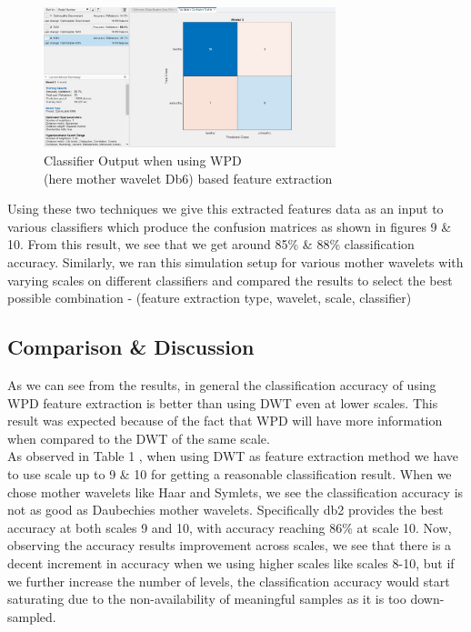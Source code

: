 \documentclass[10pt,twocolumn,letterpaper]{article}
\begin{document}
\begin{figure}[htbp]
\includegraphics[width=8.5cm]{WPD_result_db6.jpg}
\caption{Classifier Output when using WPD \\ (here mother wavelet Db6) based feature extraction}
\label{WPD Simulation}
\end{figure}
Using these two techniques we give this extracted features data as an input to various classifiers which produce the confusion matrices as shown in figures 9 \& 10. From this result, we see that we get around 85\% \& 88\% classification accuracy. Similarly, we ran this simulation setup for various mother wavelets with varying scales on different classifiers and compared the results to select the best possible combination - (feature extraction type, wavelet, scale, classifier)
\subsection{Comparison \& Discussion}

As we can see from the results, in general the classification accuracy of using WPD feature extraction is better than using DWT even at lower scales. This result was expected because of the fact that WPD will have more information when compared to the DWT of the same scale. \\
As observed in Table 1 , when using DWT as feature extraction method we have to use scale up to 9 \& 10 for getting a reasonable classification result. When we chose mother wavelets like Haar and Symlets, we see the classification accuracy is not as good as Daubechies mother wavelets. Specifically db2 provides the best accuracy at both scales 9 and 10, with accuracy reaching 86\% at scale 10. Now, observing the accuracy results improvement across scales, we see that there is a decent increment in accuracy when we using higher scales like scales 8-10, but if we further increase the number of levels, the classification accuracy would start saturating due to the non-availability of meaningful samples as it is too down-sampled.
\end{document}
